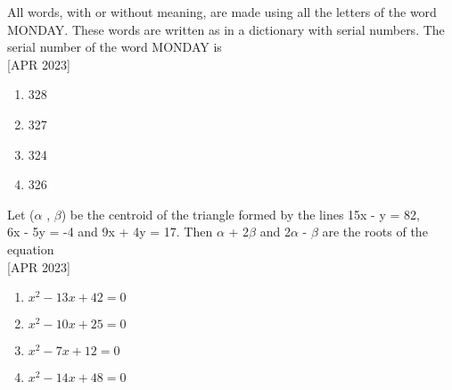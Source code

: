     \bigskip
    \item All words, with or without meaning, are made using all the letters of the word MONDAY. These words are written as in a dictionary with serial numbers. The serial number of the word MONDAY is \\\hfill{[APR 2023]}
    \begin{multicols}{4}
    \begin{enumerate}
        \item 328
        \item 327
        \item 324
        \item 326
    \end{enumerate} 
    \end{multicols}
    \bigskip
    \item  Let ($\alpha$ , $\beta$) be the centroid of the triangle formed by the lines 15x - y = 82, \\6x - 5y = -4 and 9x + 4y = 17. Then $\alpha$ + 2$\beta$ and 2$\alpha$ - $\beta$ are the roots of the equation \\\hfill{[APR 2023]}
    \begin{multicols}{4}
    \begin{enumerate}
        \item $x^2 - 13x + 42 = 0$
        \item $x^2 - 10x + 25 = 0$
        \item $x^2 - 7x + 12 = 0$
        \item $x^2 - 14x + 48 = 0$
    \end{enumerate} 
    \end{multicols}
    \bigskip
